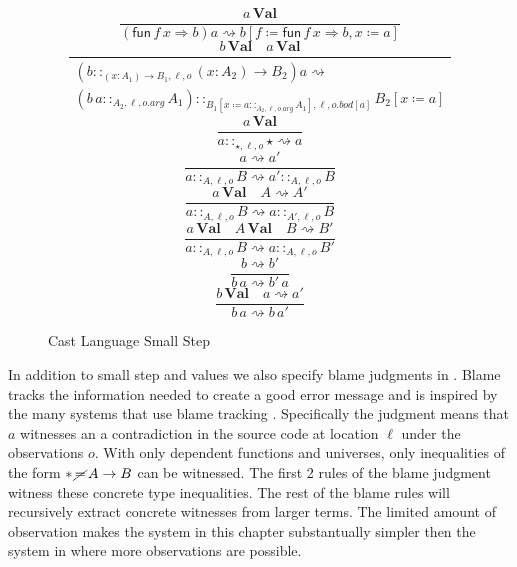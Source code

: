 \begin{figure}
\[
\frac{a\,\textbf{Val}}{\left(\mathsf{fun}\,f\,x\Rightarrow b\right)a\rightsquigarrow b\left[f\coloneqq\mathsf{fun}\,f\,x\Rightarrow b,x\coloneqq a\right]}
\]
\[
\frac{b\,\textbf{Val}\quad a\,\textbf{Val}}{\begin{array}{c}
\left(b::_{\left(x:A_{1}\right)\rightarrow B_{1},\ell ,o}\left(x:A_{2}\right)\rightarrow B_{2}\right)a\rightsquigarrow\\
\left(b\,a::_{A_{2},\ell,o.arg}A_{1}\right)::_{B_{1}\left[x\coloneqq a::_{A_{2},\ell,o.arg}A_{1}\right],\ell ,o.bod[a]}B_{2}\left[x\coloneqq a\right]
\end{array}}
\]
\[
\frac{a\,\textbf{Val}}{a::_{\star,\ell ,o}\star\rightsquigarrow a}
\]
\[
\frac{a\rightsquigarrow a'}{a::_{A,\ell ,o}B\rightsquigarrow a'::_{A,\ell ,o}B}
\]
\[
\frac{a\,\textbf{Val}\quad A\rightsquigarrow A'}{a::_{A,\ell ,o}B\rightsquigarrow a::_{A',\ell ,o}B}
\]
\[
\frac{a\,\textbf{Val}\quad A\,\textbf{Val}\quad B\rightsquigarrow B'}{a::_{A,\ell ,o}B\rightsquigarrow a::_{A,\ell ,o}B'}
\]
\[
\frac{b\rightsquigarrow b'}{b\,a\rightsquigarrow b'\,a}
\]
\[
\frac{b\,\textbf{Val}\quad a\rightsquigarrow a'}{b\,a\rightsquigarrow b\,a'}
\]

\caption{Cast Language Small Step}
\label{fig:cast-step}
\end{figure}

In addition to small step and values we also specify blame judgments in .
Blame tracks the information needed to create a good error message and is inspired by the many systems that use blame tracking \cite{10.1145/581478.581484,10.1007/978-3-642-00590-9_1,wadler:LIPIcs:2015:5033}.
Specifically the judgment  means that $a$ witnesses an a contradiction in the source code at location $\ell$ under the observations $o$.
With only dependent functions and universes, only inequalities of the form $*\,\cancel{=}\,A\rightarrow B$ can be witnessed.
The first 2 rules of the blame judgment witness these concrete type inequalities.
The rest of the blame rules will recursively extract concrete witnesses from larger terms.
The limited amount of observation makes the system in this chapter substantually simpler then the system in  where more observations are possible.

